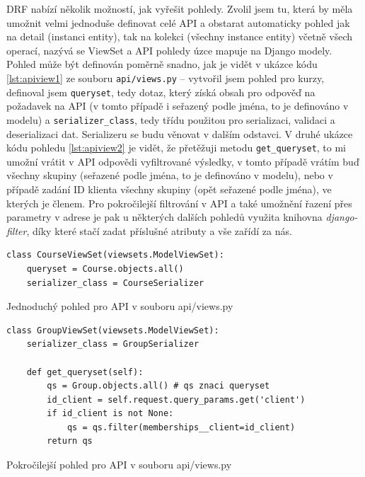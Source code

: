     DRF nabízí několik možností, jak vyřešit pohledy. Zvolil jsem tu, která by měla umožnit velmi jednoduše definovat celé API a obstarat automaticky pohled jak na detail (instanci entity), tak na kolekci (všechny instance entity) včetně všech operací, nazývá se ViewSet a API pohledy úzce mapuje na Django modely. Pohled může být definován poměrně snadno, jak je vidět v ukázce kódu \ref{lst:apiview1} ze souboru \verb|api/views.py| -- vytvořil jsem pohled pro kurzy, definoval jsem \verb|queryset|, tedy dotaz, který získá obsah pro odpověď na požadavek na API (v tomto případě i seřazený podle jména, to je definováno v modelu) a \verb|serializer_class|, tedy třídu použitou pro serializaci, validaci a deserializaci dat. Serializeru se budu věnovat v dalším odstavci. V druhé ukázce kódu pohledu \ref{lst:apiview2} je vidět, že přetěžuji metodu \verb|get_queryset|, to mi umožní vrátit v API odpovědi vyfiltrované výsledky, v tomto případě vrátím buď všechny skupiny (seřazené podle jména, to je definováno v modelu), nebo v případě zadání ID klienta všechny skupiny (opět seřazené podle jména), ve kterých je členem. Pro pokročilejší filtrování v API a také umožnění řazení přes parametry v adrese je pak u některých dalších pohledů využita knihovna \textit{django-filter}, díky které stačí zadat příslušné atributy a vše zařídí za nás.
    
    \begin{listing}[ht]
    	\begin{verbatim}
class CourseViewSet(viewsets.ModelViewSet):
    queryset = Course.objects.all()
    serializer_class = CourseSerializer
    	\end{verbatim}
    	\caption{Jednoduchý pohled pro API v souboru api/views.py}\label{lst:apiview1}
    \end{listing}
    
    \begin{listing}[ht]
    	\begin{verbatim}
class GroupViewSet(viewsets.ModelViewSet):
    serializer_class = GroupSerializer

    def get_queryset(self):
        qs = Group.objects.all() # qs znaci queryset
        id_client = self.request.query_params.get('client')
        if id_client is not None:
            qs = qs.filter(memberships__client=id_client)
        return qs
    	\end{verbatim}
    	\caption{Pokročilejší pohled pro API v souboru api/views.py}\label{lst:apiview2}
    \end{listing}
    
